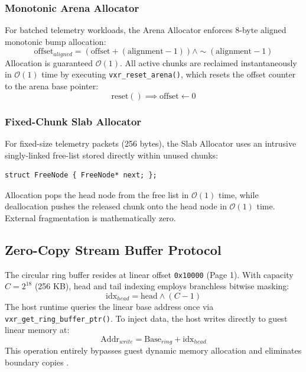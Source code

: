 \subsubsection{Monotonic Arena Allocator}
For batched telemetry workloads, the Arena Allocator enforces 8-byte aligned monotonic bump allocation:
\begin{equation}
\text{offset}_{aligned} = (\text{offset} + (\text{alignment} - 1)) \land \sim(\text{alignment} - 1)
\end{equation}
Allocation is guaranteed $\mathcal{O}(1)$. All active chunks are reclaimed instantaneously in $\mathcal{O}(1)$ time by executing \texttt{vxr\_reset\_arena()}, which resets the offset counter to the arena base pointer:
\begin{equation}
\text{reset}() \implies \text{offset} \leftarrow 0
\end{equation}

\subsubsection{Fixed-Chunk Slab Allocator}
For fixed-size telemetry packets (256 bytes), the Slab Allocator uses an intrusive singly-linked free-list stored directly within unused chunks:
\begin{verbatim}
struct FreeNode { FreeNode* next; };
\end{verbatim}
Allocation pops the head node from the free list in $\mathcal{O}(1)$ time, while deallocation pushes the released chunk onto the head node in $\mathcal{O}(1)$ time. External fragmentation is mathematically zero.

\subsection{Zero-Copy Stream Buffer Protocol}
The circular ring buffer resides at linear offset \texttt{0x10000} (Page 1). With capacity $C = 2^{18}$ (256 KB), head and tail indexing employs branchless bitwise masking:
\begin{equation}
\text{idx}_{head} = \text{head} \land (C - 1)
\end{equation}
The host runtime queries the linear base address once via \texttt{vxr\_get\_ring\_buffer\_ptr()}. To inject data, the host writes directly to guest linear memory at:
\begin{equation}
\text{Addr}_{write} = \text{Base}_{ring} + \text{idx}_{head}
\end{equation}
This operation entirely bypasses guest dynamic memory allocation and eliminates boundary copies \cite{chu1996zero}.

